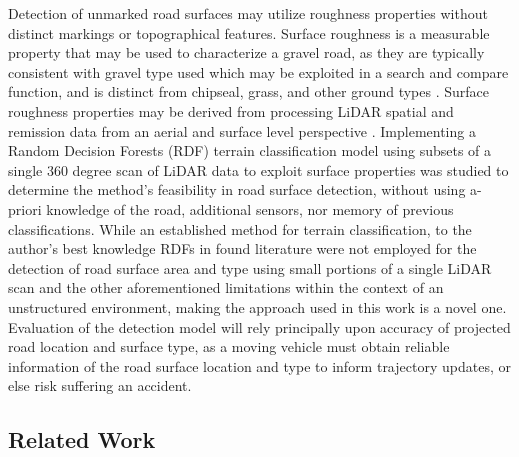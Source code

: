 \documentclass[journal,onecolumn]{IEEEtran}
\begin{document}
	{Detection of unmarked road surfaces may utilize roughness properties without distinct markings or topographical features. Surface roughness is a measurable property that may be used to characterize a gravel road, as they are typically consistent with gravel type used \cite{skorseth_gravel_nodate} which may be exploited in a search and compare function, and is distinct from chipseal, grass, and other ground types \cite{wan_road_2007, levi_3d_2012_light, levi_3d_2012_terrain}. Surface roughness properties may be derived from processing LiDAR spatial and remission data from an aerial and surface level perspective \cite{wan_road_2007, levi_3d_2012_light, levi_3d_2012_terrain, pollyea_experimental_2012,rychkov_computational_2012,lague_accurate_2013,brubaker_use_2013,turner_estimation_2014,campbell_lidar-based_2017,shepard_roughness_2001,tegowski_statistical_2016,sock_probabilistic_2016,milenkovic_roughness_2018,yadav_extraction_2017, yadav_rural_2018}. Implementing a Random Decision Forests (RDF) terrain classification model using subsets of a single 360 degree scan of LiDAR data to exploit surface properties was studied to determine the method's feasibility in road surface detection, without using a-priori knowledge of the road, additional sensors, nor memory of previous classifications. While an established method for terrain classification, to the author's best knowledge RDFs in found literature were not employed for the detection of road surface area and type using small portions of a single LiDAR scan and the other aforementioned limitations within the context of an unstructured environment, making the approach used in this work is a novel one. Evaluation of the detection model will rely principally upon accuracy of projected road location and surface type, as a moving vehicle must obtain reliable information of the road surface location and type to inform trajectory updates, or else risk suffering an accident.}


	\subsection{Related Work}
\end{document}
